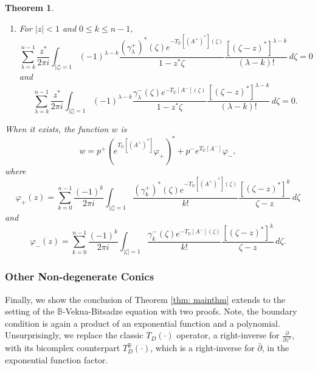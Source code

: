 \documentclass[12pt,reqno]{amsart}
\newtheorem{theorem}{Theorem}[section]
\theoremstyle{definition}
\theoremstyle{remark}
\newcommand{\p}{\partial}
\newcommand{\dbar}{\bar\partial}
\newcommand{\bc}{\mathbb{B}}
\newcommand{\disk}{\mathbb{D}}
\begin{document}
\begin{theorem}
\begin{enumerate}
                        \item For $|z| < 1$  and $0 \leq k \leq n-1$,
                        \[
                            \sum_{\lambda = k}^{n-1}\frac{z^*}{2\pi i} \int_{|\zeta| = 1} (-1)^{\lambda - k} \frac{(\gamma_\lambda^+)^*(\zeta)e^{-T_\disk[(A^+)^*](\zeta)}}{1- z^*\zeta} \frac{[(\zeta - z)^*]^{\lambda- k}}{(\lambda - k)!}\,d\zeta   = 0
                        \]
                        and
                     \[
                            \sum_{\lambda = k}^{n-1}\frac{z^*}{2\pi i} \int_{|\zeta| = 1} (-1)^{\lambda - k} \frac{\gamma_\lambda^-(\zeta) e^{-T_\disk[A^-](\zeta)}}{1- z^* \zeta} \frac{[(\zeta - z)^*]^{\lambda- k}}{(\lambda - k)!}\,d\zeta   = 0.
                    \]
                    \end{enumerate}
                    When it exists, the function $w$ is
                    \[
                        w = p^+ (e^{T_\disk[(A^+)^*]}  \varphi_+)^* + p^- e^{T_\disk[A^-]} \varphi_-, 
                    \]
                    where
                    \[
                        \varphi_+(z) =  \sum_{k=0}^{n-1} \frac{(-1)^k}{2\pi i} \int_{|\zeta| = 1} \frac{(\gamma_k^+)^*(\zeta)e^{-T_\disk[(A^+)^*](\zeta)}}{k!} \frac{[(\zeta - z)^*]^k}{\zeta - z}\,d\zeta 
                    \]
                    and
                    \[
                        \varphi_-(z) =  \sum_{k=0}^{n-1} \frac{(-1)^k}{2\pi i} \int_{|\zeta| = 1} \frac{\gamma_k^-(\zeta)e^{-T_\disk[A^-](\zeta)}}{k!} \frac{[(\zeta - z)^*]^k}{\zeta - z}\,d\zeta .
                    \]
                \end{theorem}


           

        \subsubsection{Other Non-degenerate Conics}\label{last one}

            Finally, we show the conclusion of Theorem \ref{thm: mainthm} extends to the setting of the $\bc$-Vekua-Bitsadze equation with two proofs. Note, the boundary condition is again a product of an exponential function and a polynomial. Unsurprisingly, we replace the classic $T_D(\cdot)$ operator, a right-inverse for $\frac{\p}{\p z^*}$, with its bicomplex counterpart $T_D^\bc(\cdot)$, which is a right-inverse for $\dbar$, in the exponential function factor. 
\end{document}
